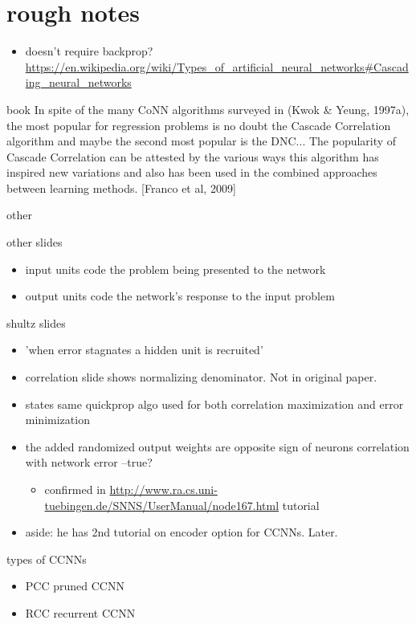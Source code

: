 \documentclass{beamer}
\begin{document}
\section{rough notes}
\label{sec:orgb0e1b95}
\begin{itemize}
\item doesn't require backprop? \url{https://en.wikipedia.org/wiki/Types\_of\_artificial\_neural\_networks\#Cascading\_neural\_networks}
\end{itemize}

\begin{frame}[label={sec:orgc434aa2}]{book}
  In spite of the many CoNN algorithms surveyed in (Kwok \& Yeung, 1997a), the most popular for regression problems is no doubt the Cascade Correlation algorithm and maybe the second most popular is the DNC...
  The popularity of Cascade Correlation can be attested by the various ways this
  algorithm has inspired new variations and also has been used in the combined
  approaches between learning methods. [Franco et al, 2009] 
\end{frame}
\begin{frame}[label={sec:org558d821}]{other}
  \begin{block}{other slides}
    \begin{itemize}
    \item input units code the problem being presented to the network
    \item output units code the network's response to the input problem
    \end{itemize}
  \end{block}
  \begin{block}{shultz slides}
    \begin{itemize}
    \item 'when error stagnates a hidden unit is recruited'
    \item correlation slide shows normalizing denominator. Not in original paper.
    \item states same quickprop algo used for both correlation maximization and error minimization
    \item the added randomized output weights are opposite sign of neurons correlation with network error --true?
    \begin{itemize}
    \item confirmed in \url{http://www.ra.cs.uni-tuebingen.de/SNNS/UserManual/node167.html} tutorial
    \end{itemize}
    \item aside: he has 2nd tutorial on encoder option for CCNNs. Later.
    \end{itemize}
  \end{block}
  \begin{block}{types of CCNNs}
    \begin{itemize}
    \item PCC pruned CCNN
    \item RCC recurrent CCNN
    \end{itemize}
  \end{block}
\end{frame}
\end{document}
